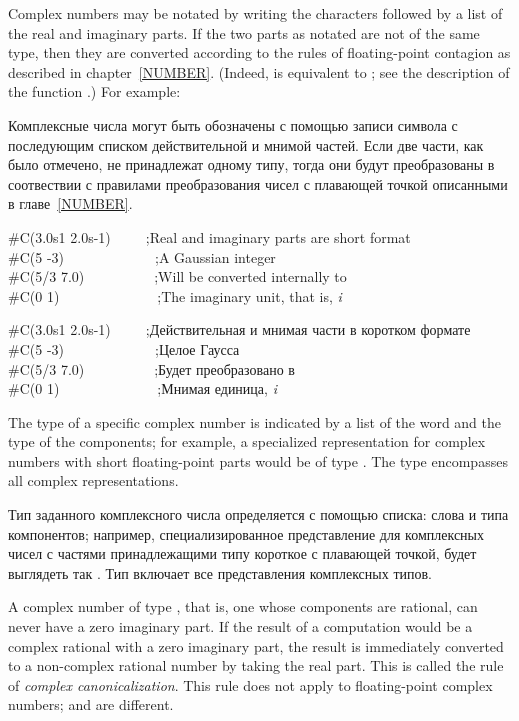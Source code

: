 Complex numbers may be notated by writing the characters 
followed by a list of the real and imaginary parts.
If the two parts as notated are not of the same type, then
they are converted according to the rules of floating-point contagion
as described in chapter~\ref{NUMBER}.
(Indeed,  is equivalent to ;
see the description of the function .)
For example:

Комплексные числа могут быть обозначены с помощью записи символа  с
последующим списком действительной и мнимой частей.
Если две части, как было отмечено, не принадлежат одному типу, тогда они будут
преобразованы в соотвествии с правилами преобразования чисел с плавающей точкой
описанными в главе~\ref{NUMBER}.
\begin{lisp}
\#C(3.0s1 2.0s-1)~~~~~;{\rm Real and imaginary parts are short format}\\
\#C(5 -3)~~~~~~~~~~~~~;{\rm A Gaussian integer} \\
\#C(5/3 7.0)~~~~~~~~~~;{\rm Will be converted internally to } \\
\#C(0 1)~~~~~~~~~~~~~~;{\rm The imaginary unit, that is, {\it i}}
\end{lisp}

\begin{lisp}
\#C(3.0s1 2.0s-1)~~~~~;{\rm Действительная и мнимая части в коротком формате}\\
\#C(5 -3)~~~~~~~~~~~~~;{\rm Целое Гаусса} \\
\#C(5/3 7.0)~~~~~~~~~~;{\rm Будет преобразовано в } \\
\#C(0 1)~~~~~~~~~~~~~~;{\rm Мнимая единица, {\it i}}
\end{lisp}

The type of a specific complex number is indicated by a list
of the word  and the type of the components; for example,
a specialized representation for complex numbers with short floating-point
parts would be of type .  The type 
encompasses all complex representations.

Тип заданного комплексного числа определяется с помощью списка: слова
 и типа компонентов; например, специализированное представление для
комплексных чисел с частями принадлежащими типу короткое с плавающей точкой,
будет выглядеть так . Тип  включает все
представления комплексных типов.

A complex number of type , that is, one whose
components are rational, can never have a zero imaginary part.
If the result of a computation would be a complex rational
with a zero imaginary part, the result is immediately
converted to a non-complex rational number by taking the
real part.  This is called the rule of {\it complex canonicalization}.
This rule does not apply to floating-point complex numbers;
 and  are different.

